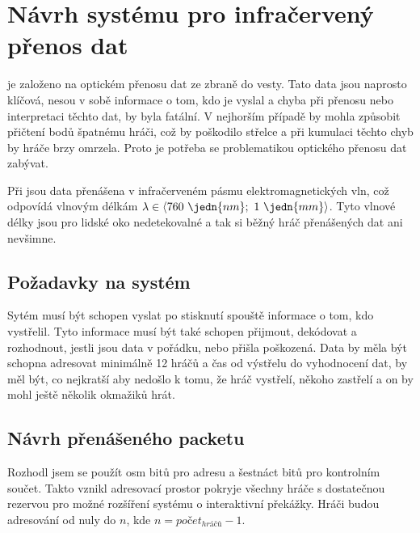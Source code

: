 \chapter{Návrh systému pro infračervený přenos dat}
 je založeno na optickém přenosu dat ze zbraně do vesty. Tato data jsou naprosto klíčová, nesou v sobě informace o tom, kdo je vyslal a chyba při přenosu nebo interpretaci těchto dat, by byla fatální. V nejhorším případě by mohla způsobit přičtení bodů špatnému hráči, což by poškodilo střelce a při kumulaci těchto chyb by  hráče brzy omrzela. Proto je potřeba se problematikou optického přenosu dat zabývat.

Při  jsou data přenášena v infračerveném pásmu elektromagnetických vln, což odpovídá vlnovým délkám $\lambda \in \langle 760~\jedn{nm};~1~\jedn{mm}\rangle$. Tyto vlnové délky jsou pro lidské oko nedetekovalné a tak si běžný hráč přenášených dat ani nevšimne.

\section{Požadavky na systém}
Sytém musí být schopen vyslat po stisknutí spouště informace o tom, kdo vystřelil. Tyto informace musí být také schopen přijmout, dekódovat a rozhodnout, jestli jsou data v pořádku, nebo přišla poškozená. Data by měla být schopna adresovat minimálně 12 hráčů a čas od výstřelu do vyhodnocení dat, by měl být, co nejkratší aby nedošlo k tomu, že hráč vystřelí, někoho zastřelí a on by mohl ještě několik okmažiků hrát.

\section{Návrh přenášeného packetu}
Rozhodl jsem se použít osm bitů pro adresu a šestnáct bitů pro kontrolním součet. Takto vznikl adresovací prostor pokryje všechny hráče s dostatečnou rezervou pro možné rozšíření systému o interaktivní překážky. Hráči budou adresování od nuly do $n$, kde $n = počet _{hráčů} - 1$.

